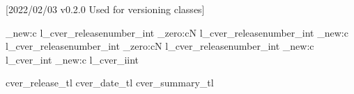 [2022/02/03 v0.2.0 Used for 
versioning classes]
\RequirePackage{xparse}
\RequirePackage{pgf}
\RequirePackage{readprov}
\RequirePackage{alphalph}
\RequirePackage{ifthen}

\providecommand*{\file}[1]{\texttt {#1}}
\providecommand*{\Lpack}[1]{\textsf {#1}}

\def\classname#1{\gdef\@classname{#1} \title{Installation check and 
release information for 
\Lpack{\@classname} up to release \classversion@currentRelease}}


\ExplSyntaxOn
\int_new:c l_cver_releasenumber_int
\int_zero:cN l_cver_releasenumber_int
\int_new:c l_cver_releasenumber_int
\int_zero:cN l_cver_releasenumber_int
\int_new:c l_cver_int
\int_new:c l_cver_iint


    {\csname cver_release_tl\endcsname}
    {\csname cver_date_tl\endcsname}
    {\csname cver_summary_tl\endcsname} 
    
